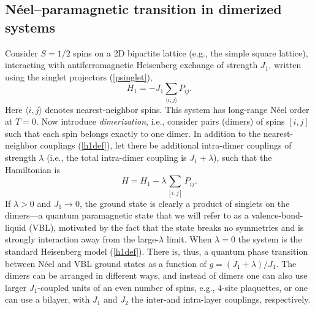 \documentclass[range]{ar2e}
\begin{document}
\subsection{N\'eel--paramagnetic transition in dimerized systems}
\label{sec:dimermodels}

Consider $S=1/2$ spins on a 2D bipartite lattice (e.g., the simple square lattice), interacting with antiferromagnetic Heisenberg exchange of 
strength $J_1$, written using the singlet projectors (\ref{psinglet}),
\begin{equation}
H_1 = -J_1 \sum_{\langle i,j\rangle} P_{ij}.
\label{h1def}
\end{equation}
Here $\langle i,j\rangle$ denotes nearest-neighbor spins. This system has long-range N\'eel order at $T=0$. Now introduce {\it dimerization}, 
i.e., consider pairs (dimers) of spins $[i,j]$ such that each spin belongs exactly to one dimer. In addition to the nearest-neighbor couplings (\ref{h1def}),
let there be additional intra-dimer couplings of strength $\lambda$ (i.e., the total intra-dimer coupling is $J_1+\lambda$), such that the Hamiltonian is
\begin{equation}
H = H_1  -\lambda \sum_{[ i,j]} P_{ij} .
\end{equation}
If $\lambda>0$ and $J_1\to 0$, the ground state is clearly a product of singlets on the dimers---a quantum paramagnetic state that we will refer
to as a valence-bond-liquid (VBL), motivated by the fact that the state breaks no symmetries and is strongly interaction away from the large-$\lambda$
limit. When $\lambda=0$  the system is the standard Heisenberg model (\ref{h1def}). There is, thus, a quantum phase transition between N\'eel and VBL ground 
states as a function of $g=(J_1+\lambda)/J_1$. The dimers can be arranged in different ways, and instead of dimers one can also use larger $J_1$-coupled 
units of an even number of spins, e.g., $4$-site plaquettes, or one can use a bilayer, with $J_1$ and $J_2$ the inter-and intra-layer couplings, respectively.
\end{document}
